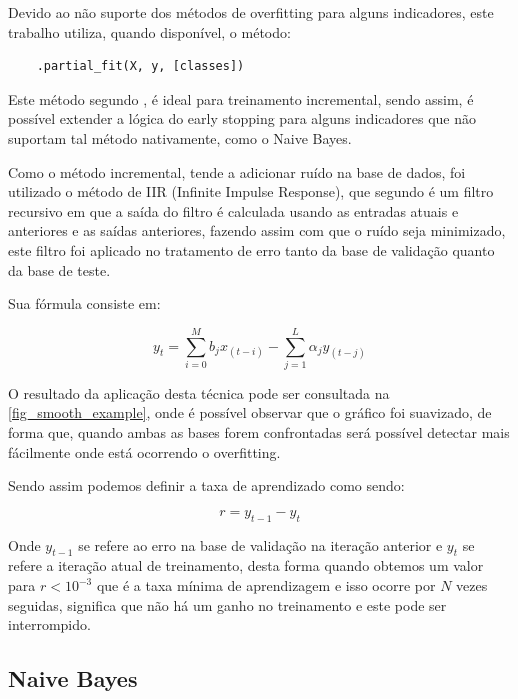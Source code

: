 \documentclass[
article,			%
11pt,				%
oneside,			%
a4paper,			%
english,			%
brazil,				%
sumario=tradicional,
]{abntex2}
\begin{document}
	Devido ao não suporte dos métodos de overfitting para alguns indicadores, este trabalho utiliza, quando disponível, o método:
	
	\begin{verbatim}
	.partial_fit(X, y, [classes])
	\end{verbatim}
	
	Este método segundo , é ideal para treinamento incremental, sendo assim, é possível extender a lógica do early stopping para alguns indicadores que não suportam tal método nativamente, como o Naive Bayes.
	
	Como o método incremental, tende a adicionar ruído na base de dados, foi utilizado o método de IIR (Infinite Impulse Response), que segundo  é um filtro recursivo em que a saída do filtro é calculada usando as entradas atuais e anteriores e as saídas anteriores, fazendo assim com que o ruído seja minimizado, este filtro foi aplicado no tratamento de erro tanto da base de validação quanto da base de teste.
	
	Sua fórmula consiste em:
	
	\begin{equation}
	y_t = \sum_{i=0}^M b_jx_(t-i) - \sum_{j=1}^{L} \alpha_j y_(t-j)
	\end{equation}
	
	O resultado da aplicação desta técnica pode ser consultada na  \autoref{fig_smooth_example}, onde é possível observar que o gráfico foi suavizado, de forma que, quando ambas as bases forem confrontadas será possível detectar mais fácilmente onde está ocorrendo o overfitting.
	
	Sendo assim podemos definir a taxa de aprendizado como sendo:
	
	\begin{equation}
	r = {y_{t-1}} - {y_{t}}
	\end{equation}
	
	Onde \({y_{t-1}} \) se refere ao erro na base de validação na iteração anterior e \({y_t}\) se refere a iteração atual de treinamento, desta forma quando obtemos um valor para \(r < {10^{-3}}\) que é a taxa mínima de aprendizagem e isso ocorre por \(N\) vezes seguidas, significa que não há um ganho no treinamento e este pode ser interrompido.
	
	
 	
	\subsection{Naive Bayes}
	
\end{document}
